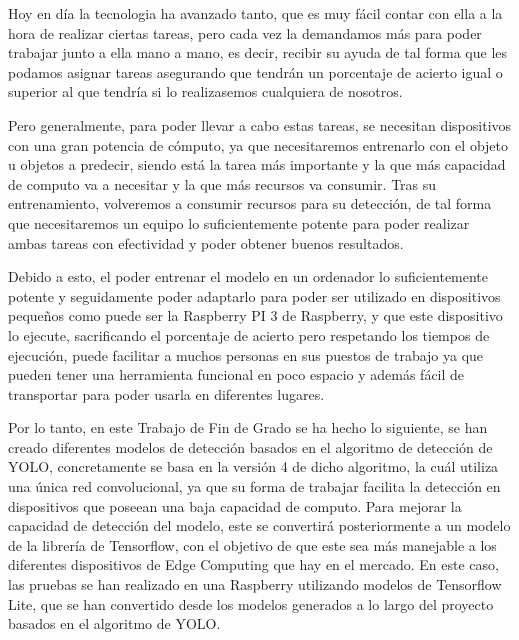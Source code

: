 
Hoy en día la tecnologia ha avanzado tanto, que es muy fácil contar con ella a la hora de realizar ciertas tareas, pero cada vez la demandamos 
más para poder trabajar junto a ella mano a mano, es decir, recibir su ayuda de tal forma que les podamos asignar tareas asegurando que tendrán un
porcentaje de acierto igual o superior al que tendría si lo realizasemos cualquiera de nosotros.

Pero generalmente, para poder llevar a cabo estas tareas, se necesitan dispositivos con una gran potencia de cómputo, ya que necesitaremos entrenarlo 
con el objeto u objetos a predecir, siendo está la tarea más importante y la que más capacidad de computo va a necesitar y la que más recursos va consumir.
Tras su entrenamiento, volveremos a consumir recursos para su detección, de tal forma que necesitaremos un equipo lo suficientemente potente para poder realizar
ambas tareas con efectividad y poder obtener buenos resultados.

Debido a esto, el poder entrenar el modelo en un ordenador lo suficientemente potente y seguidamente poder adaptarlo para poder ser utilizado en dispositivos pequeños
como puede ser la Raspberry PI 3 de Raspberry, y que este dispositivo lo ejecute, sacrificando el porcentaje de acierto pero respetando los tiempos de ejecución, puede facilitar a
muchos personas en sus puestos de trabajo ya que pueden tener una herramienta funcional en poco espacio y además fácil de transportar para poder usarla en diferentes
lugares.

Por lo tanto, en este Trabajo de Fin de Grado se ha hecho lo siguiente, se han creado diferentes modelos de detección basados en el algoritmo de detección de YOLO, concretamente se basa en la versión 4 de dicho algoritmo, la cuál utiliza una única red convolucional, ya que su forma de trabajar facilita la detección en dispositivos que poseean una baja capacidad de computo.
Para mejorar la capacidad de detección del modelo, este se convertirá posteriormente a un modelo de la librería de Tensorflow, con el objetivo de que este sea más manejable a los diferentes dispositivos de Edge Computing que hay en el mercado.
En este caso, las pruebas se han realizado en una Raspberry utilizando modelos de Tensorflow Lite, que se han convertido desde los modelos generados a lo largo del proyecto basados en el algoritmo de YOLO.

